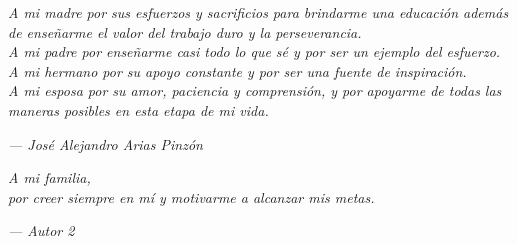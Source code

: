 \cleardoublepage{}
\thispagestyle{empty}

\vspace*{4cm}

\begin{center}
\textit{
    A mi madre por sus esfuerzos y sacrificios para brindarme una educación además de enseñarme el valor del trabajo duro y la perseverancia. \\
    A mi padre por enseñarme casi todo lo que sé y por ser un ejemplo del esfuerzo. \\
    A mi hermano por su apoyo constante y por ser una fuente de inspiración.\\
    A mi esposa por su amor, paciencia y comprensión, y por apoyarme de todas las maneras posibles en esta etapa de mi vida.\\
}

\vspace{2cm}

\hfill \textit{--- José Alejandro Arias Pinzón}

\vspace{3cm}

\textit{
A mi familia,\\
por creer siempre en mí y motivarme a alcanzar mis metas.
}

\vspace{2cm}

\hfill \textit{--- Autor 2}
\end{center}
